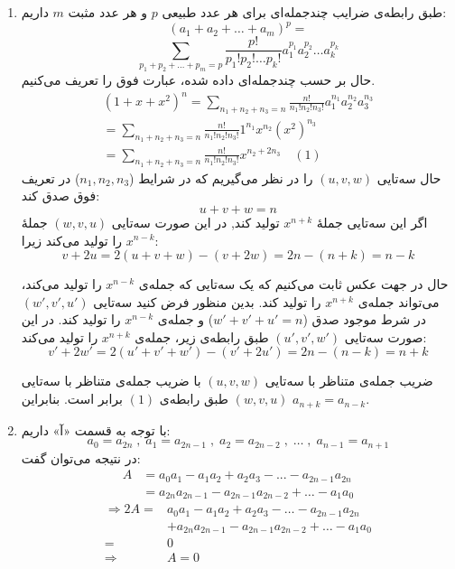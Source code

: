 	\begin{enumerate}
		\item 
        \p
        طبق رابطه‌ی ضرایب چندجمله‌ای برای هر عدد
         طبیعی 
         $p$
         و هر عدد مثبت 
         $m$ 
          داریم:
        $$(a_1+a_2+\ldots+a_m)^p = $$
        $$\sum_{p_1+p_2+\ldots+p_m=p} \frac{p!}{p_1!p_2!\ldots p_k!} a_1^{p_1}a_2^{p_2}\ldots a_k^{p_k}$$
        حال بر حسب چندجمله‌ای داده ‌شده، عبارت فوق را تعریف می‌کنیم.
        \begin{align*}
		(1+x+x^2)^n = \sum_{n_1+n_2+n_3=n} \frac{n!}{n_1!n_2!n_3!} a_1^{n_1} a_2^{n_2} a_3^{n_3}\\
		= \sum_{n_1+n_2+n_3=n} \frac{n!}{n_1!n_2!n_3!} 1^{n_1} x^{n_2} (x^2)^{n_3}\\
		= \sum_{n_1+n_2+n_3=n} \frac{n!}{n_1!n_2!n_3!} x^{n_2 + 2n_3}  \quad (1)
        \end{align*}
		حال سه‌تایی
         $(u , v , w)$
         را در نظر می‌گیریم که در شرایط 
         ($n_1 , n_2 , n_3$)
       در تعریف فوق صدق کند:
       $$u + v + w = n$$
        اگر این سه‌تایی  جملهٔ $x^{n + k}$ تولید کند, در این صورت سه‌تایی $(w , v , u)$ جملهٔ $x^{n - k}$ را تولید می‌کند زیرا:
        $$v + 2u = 2(u + v + w) - (v + 2w) = 2n - (n + k) = n -k$$
        
        \p
        حال در جهت عکس ثابت می‌کنیم که یک سه‌تایی که جمله‌ی
        $x^{n-k}$
        را تولید می‌کند، می‌تواند جمله‌ی
        $x^{n+k}$
        را تولید کند. بدین منظور فرض کنید سه‌تایی
        $(w', v', u')$
        در شرط موجود صدق 
        ($w' + v' + u'=n$)
        و جمله‌ی
        $x^{n-k}$
        را تولید کند.
        در این صورت سه‌تایی
        $(u',v',w')$
        طبق رابطه‌ی زیر، جمله‌ی 
        $x^{n+k}$
        را تولید می‌کند:
    	$$v' + 2w' = 2(u' + v' + w') - (v' + 2u') = 2n - (n - k) = n +k$$
	
        \p
    	 ضریب جمله‌ی متناظر با سه‌تایی 
        $(u , v , w)$ 
        با ضریب جمله‌ی متناظر با سه‌تایی 
        $(w , v , u)$
         طبق رابطه‌ی $(1)$ برابر است. بنابراین 
         $a_{n + k} = a_{n - k}$.
	
	\item
        \p
          با توجه به قسمت  
          «آ»
          داریم:
    	$$a_0 = a_{2n} \; ,\; a_1 = a_{2n - 1}\; ,\; a_2 = a_{2n - 2}\; ,\; \dots \; ,\; a_{n - 1} = a_{n + 1}$$
        در نتیجه می‌توان گفت:
        \begin{align*}
            A &= a_0a_1 - a_1a_2 + a_2a_3 - ... - a_{2n-1}a_{2n} \\
            &= a_{2n}a_{2n-1} - a_{2n-1}a_{2n-2} +\dots - a_1a_0 
        \end{align*}
    	\begin{align*}
    		\Rightarrow 2A = &a_0a_1 - a_1a_2 + a_2a_3 - \dots - a_{2n-1}a_{2n}\\
    		&+ a_{2n}a_{2n-1} - a_{2n-1}a_{2n-2} +\dots - a_1a_0 \\
            = &0\\
    		\Rightarrow &A = 0
    	\end{align*}
	

\end{enumerate}
